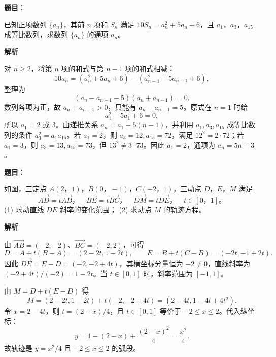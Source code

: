 \begin{answer}

\textbf{题目}：

已知正项数列 \(\{a_n\}\)，其前 \(n\) 项和 \(S_n\) 满足 \(10S_n=a_n^2+5a_n+6\)，且 $a_1\text{，}a_3\text{，}a_{15}$ 成等比数列，求数列 \(\{a_n\}\) 的通项 \(a_n\)。

\textbf{解析}

对 $n\ge2$，将第 $n$ 项的和式与第 $n-1$ 项的和式相减：
\nopagebreak[4]
\[
10a_n=(a_n^2+5a_n+6)-(a_{n-1}^2+5a_{n-1}+6),
\]
整理为
\nopagebreak[4]
\[
(a_n-a_{n-1}-5)(a_n+a_{n-1})=0.
\]
数列各项为正，故 $a_n+a_{n-1}>0$，只能有 $a_n-a_{n-1}=5$。原式在 $n=1$ 时给
\nopagebreak[4]
\[
a_1^2-5a_1+6=0,
\]
所以 $a_1=2$ 或 $3$。由递推关系 $a_n=a_1+5(n-1)$，并利用 $a_1,a_3,a_{15}$ 成等比数列的条件 $a_3^2=a_1a_{15}$。若 $a_1=2$，则 $a_3=12,a_{15}=72$，满足 $12^2=2\cdot72$；若 $a_1=3$，则 $a_3=13,a_{15}=73$，但 $13^2\ne3\cdot73$。因此 $a_1=2$，通项为 $a_n=5n-3$。


\end{answer}
\begin{answer}

\textbf{题目}：

如图，三定点 $A(2\text{，}1)\text{，}B(0\text{，}-1)\text{，}C(-2\text{，}1)$，三动点 $D\text{，}E\text{，}M$ 满足
\nopagebreak[4]
\[
\overrightarrow{AD}=t\overrightarrow{AB}\text{，}\quad \overrightarrow{BE}=t\overrightarrow{BC}\text{，}\quad \overrightarrow{DM}=t\overrightarrow{DE}\text{，}\quad t\in[0\text{，}1]\mbox{。}
\]
(1) 求动直线 \(DE\) 斜率的变化范围；
(2) 求动点 \(M\) 的轨迹方程。
\nopagebreak[4]
\begin{center}\end{center}
\nopagebreak[4]
\textbf{解析}


由 $\overrightarrow{AB}=(-2,-2)$、$\overrightarrow{BC}=(-2,2)$，可得
\nopagebreak[4]
\[
D=A+t(B-A)=(2-2t,1-2t),\qquad E=B+t(C-B)=(-2t,-1+2t).
\]
因此 $\overrightarrow{DE}=E-D=(-2, -2+4t)$，其横坐标分量恒为 $-2\ne0$，直线斜率为 $(-2+4t)/(-2)=1-2t$。当 $t\in[0,1]$ 时，斜率范围为 $[-1,1]$。


由 $M=D+t(E-D)$ 得
\nopagebreak[4]
\[
M=(2-2t,1-2t)+t(-2,-2+4t)=(2-4t,1-4t+4t^2).
\]
令 $x=2-4t$，则 $t=(2-x)/4$，且 $t\in[0,1]$ 等价于 $-2\le x\le2$。代入纵坐标：
\nopagebreak[4]
\[
y=1-(2-x)+\frac{(2-x)^2}{4}=\frac{x^2}{4}.
\]
故轨迹是 $y=x^2/4$ 且 $-2\le x\le2$ 的弧段。



\end{answer}
